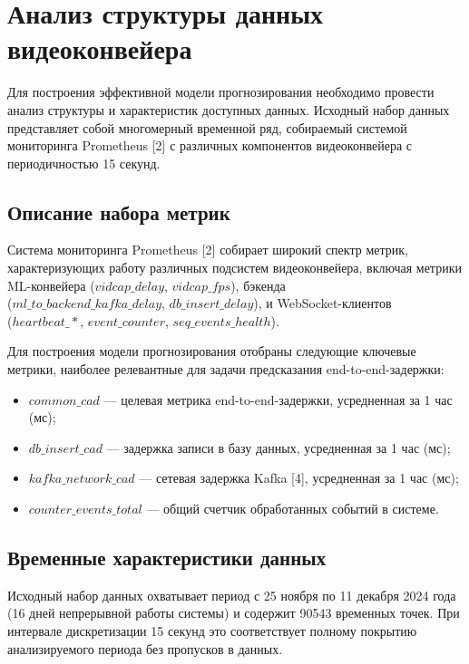 \section{Анализ структуры данных видеоконвейера}

\hspace*{1.25cm}Для построения эффективной модели прогнозирования необходимо провести анализ структуры и характеристик доступных данных. Исходный набор данных представляет собой многомерный временной ряд, собираемый системой мониторинга Prometheus [2] с различных компонентов видеоконвейера с периодичностью 15 секунд.

\subsection{Описание набора метрик}

\hspace*{1.25cm}Система мониторинга Prometheus [2] собирает широкий спектр метрик, характеризующих работу различных подсистем видеоконвейера, включая метрики ML-конвейера ($vidcap\_delay$, $vidcap\_fps$), бэкенда \\
($ml\_to\_backend\_kafka\_delay$, $db\_insert\_delay$), и WebSocket-клиентов \\
($heartbeat\_*$, $event\_counter$, $seq\_events\_health$).

\hspace*{1.25cm}Для построения модели прогнозирования отобраны следующие ключевые метрики, наиболее релевантные для задачи предсказания end-to-end-задержки:

\begin{itemize}
	\item $common\_cad$ --- целевая метрика end-to-end-задержки, усредненная за 1 час (мс);
	\item $db\_insert\_cad$ --- задержка записи в базу данных, усредненная за 1 час (мс);
	\item $kafka\_network\_cad$ --- сетевая задержка Kafka [4], усредненная за 1 час (мс);
	\item $counter\_events\_total$ --- общий счетчик обработанных событий в системе.
\end{itemize}

\subsection{Временные характеристики данных}

\hspace*{1.25cm}Исходный набор данных охватывает период с 25 ноября по 11 декабря 2024 года (16 дней непрерывной работы системы) и содержит 90543 временных точек. При интервале дискретизации 15 секунд это соответствует полному покрытию анализируемого периода без пропусков в данных.

